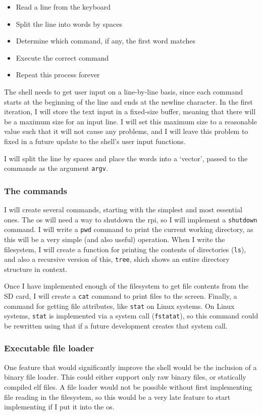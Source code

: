 \documentclass{article}
\begin{document}
\begin{itemize}
    \item Read a line from the keyboard
    \item Split the line into words by spaces
    \item Determine which command, if any, the first word matches
    \item Execute the correct command
    \item Repeat this process forever
\end{itemize}

The shell needs to get user input on a line-by-line basis, since each command
starts at the beginning of the line and ends at the newline character. In the
first iteration, I will store the text input in a fixed-size buffer, meaning
that there will be a maximum size for an input line. I will set this maximum
size to a reasonable value such that it will not cause any problems, and I will
leave this problem to fixed in a future update to the shell's user input
functions.

I will split the line by spaces and place the words into a `vector',
passed to the commands as the argument \texttt{argv}.

\subsubsection{The commands}
I will create several commands, starting with the simplest and most essential
ones. The \gls{os} will need a way to shutdown the \gls{rpi}, so I will
implement a \texttt{shutdown} command. I will write a \texttt{pwd} command to
print the current working directory, as this will be a very simple (and also
useful) operation. When I write the filesystem, I will create a function for
printing the contents of directories (\texttt{ls}), and also a recursive
version of this, \texttt{tree}, shich shows an entire directory structure in
context.

Once I have implemented enough of the filesystem to get file contents from the
SD card, I will create a \texttt{cat} command to print files to the screen.
Finally, a command for getting file attributes, like \texttt{stat} on Linux
systems. On Linux systems, \texttt{stat} is implemented via a system call
(\texttt{fstatat}), so this command could be rewritten using that if a future
development creates that system call.

\subsubsection{Executable file loader}
One feature that would significantly improve the shell would be the inclusion
of a binary file loader. This could either support only raw binary files, or
statically compiled \gls{elf} files. A file loader would not be possible
without first implementing file reading in the filesystem, so this would be a
very late feature to start implementing if I put it into the \gls{os}.
\end{document}
